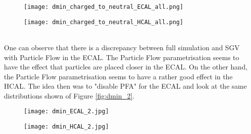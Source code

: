\documentclass[a4paper,12pt]{article}
\begin{document}
\noindent
\begin{minipage}{\linewidth}
\centering
\begin{minipage}{0.4\linewidth}
\begin{figure}[H]
    \texttt{[image: dmin\_charged\_to\_neutral\_ECAL\_all.png]}
\end{figure}
\end{minipage}
      \hspace{0.05\linewidth}
      \begin{minipage}{0.4\linewidth}
\begin{figure}[H]
    \texttt{[image: dmin\_charged\_to\_neutral\_HCAL\_all.png]} 
\end{figure}
\end{minipage}
   \label{fig:dmin}
\end{minipage}\\[0.5cm]

One can observe that there is a discrepancy between full simulation and SGV with Particle Flow in the ECAL. The Particle Flow parametrisation seems to have the effect that particles are placed closer in the ECAL. On the other hand, the Particle Flow parametrisation seems to have a rather good effect in the HCAL. The idea then was to "disable PFA" for the ECAL and look at the same distributions shown of Figure \ref{fig:dmin_2}.  

\noindent
\begin{minipage}{\linewidth}
\centering
\begin{minipage}{0.4\linewidth}
\begin{figure}[H]
    \texttt{[image: dmin\_ECAL\_2.jpg]}
\end{figure}
\end{minipage}
      \hspace{0.05\linewidth}
      \begin{minipage}{0.4\linewidth}
\begin{figure}[H]
    \texttt{[image: dmin\_HCAL\_2.jpg]} 
\end{figure}
\end{minipage}
 \label{fig:dmin_2}
\end{minipage}\\[0.5cm]
\end{document}
